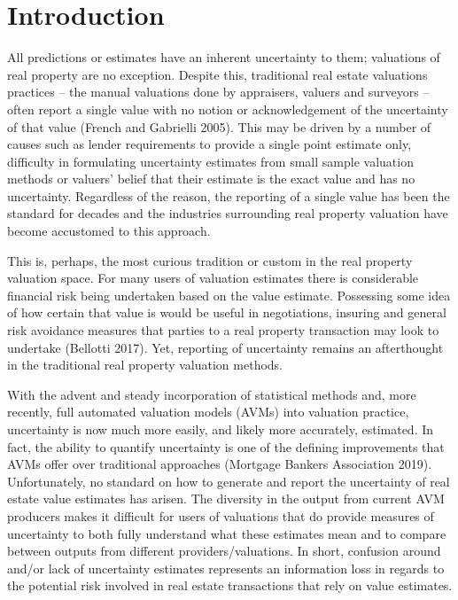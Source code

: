 \documentclass[colTwo]{format}
\theoremstyle{definition}
\begin{document}
\section{Introduction}
All predictions or estimates have an inherent uncertainty to them; valuations of real property are no exception. Despite this, traditional real estate valuations practices -- the manual valuations done by appraisers, valuers and surveyors -- often report a single value with no notion or acknowledgement of the uncertainty of that value (French and Gabrielli 2005).  This may be driven by a number of causes such as lender requirements to provide a single point estimate only, difficulty in formulating uncertainty estimates from small sample valuation methods or valuers' belief that their estimate is the exact value and has no uncertainty.  Regardless of the reason, the reporting of a single value has been the standard for decades and the industries surrounding real property valuation have become accustomed to this approach.  

This is, perhaps, the most curious tradition or custom in the real property valuation space.  For many users of valuation estimates there is considerable financial risk being undertaken based on the value estimate.  Possessing some idea of how certain that value is would be useful in negotiations, insuring and general risk avoidance measures that parties to a real property transaction may look to undertake (Bellotti 2017).  Yet, reporting of uncertainty remains an afterthought in the traditional real property valuation methods.  

With the advent and steady incorporation of statistical methods and, more recently, full automated valuation models (AVMs) into valuation practice, uncertainty is now much more easily, and likely more accurately, estimated. In fact, the ability to quantify uncertainty is one of the defining improvements that AVMs offer over traditional approaches (Mortgage Bankers Association 2019). Unfortunately, no standard on how to generate and report the uncertainty of real estate value estimates has arisen.  The diversity in the output from current AVM producers makes it difficult for users of valuations that do provide measures of uncertainty to both fully understand what these estimates mean and to compare between outputs from different providers/valuations.  In short, confusion around and/or lack of uncertainty estimates represents an information loss in regards to the potential risk involved in real estate transactions that rely on value estimates.      
\end{document}
